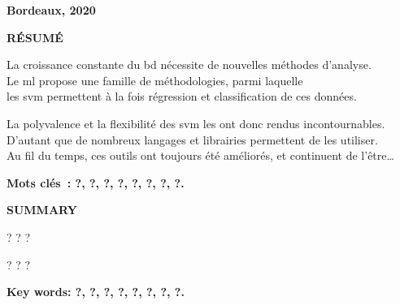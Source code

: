 {}

\cnam

\begin{large}\fulltitle\end{large}

\textbf{\goal}

\textbf{Bordeaux, 2020}

\hr

\textbf{RÉSUMÉ}

La croissance constante du \gls{bd} nécessite de nouvelles méthodes d’analyse.\\
Le \gls{ml} propose une famille de méthodologies, parmi laquelle\\
les \gls{svm} permettent à la fois régression et classification de ces données.

La polyvalence et la flexibilité des \gls{svm} les ont donc rendus incontournables.\\
D’autant que de nombreux langages et librairies permettent de les utiliser.\\
Au fil du temps, ces outils ont toujours été améliorés, et continuent de l’être…

\textbf{Mots clés : ?, ?, ?, ?, ?, ?, ?, ?.}

\hr

\textbf{SUMMARY}

?
?
?

?
?
?

\textbf{Key words: ?, ?, ?, ?, ?, ?, ?, ?.}

\thispagestyle{empty}

\pagebreak
